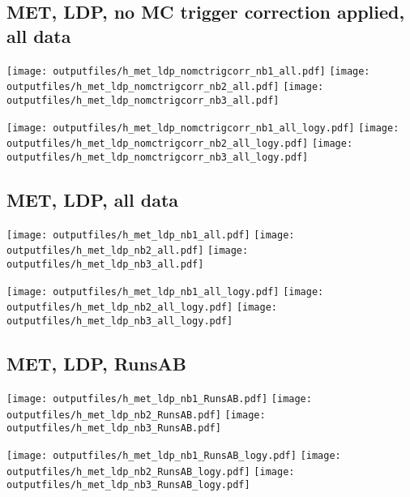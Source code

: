 \documentclass[11pt]{article}
\begin{document}
     \subsection{ MET, LDP, no MC trigger correction applied, all data}

    \noindent
     \texttt{[image: outputfiles/h\_met\_ldp\_nomctrigcorr\_nb1\_all.pdf]}
     \texttt{[image: outputfiles/h\_met\_ldp\_nomctrigcorr\_nb2\_all.pdf]}
     \texttt{[image: outputfiles/h\_met\_ldp\_nomctrigcorr\_nb3\_all.pdf]}

    \noindent
     \texttt{[image: outputfiles/h\_met\_ldp\_nomctrigcorr\_nb1\_all\_logy.pdf]}
     \texttt{[image: outputfiles/h\_met\_ldp\_nomctrigcorr\_nb2\_all\_logy.pdf]}
     \texttt{[image: outputfiles/h\_met\_ldp\_nomctrigcorr\_nb3\_all\_logy.pdf]}



    \subsection{ MET, LDP, all data}

    \noindent
     \texttt{[image: outputfiles/h\_met\_ldp\_nb1\_all.pdf]}
     \texttt{[image: outputfiles/h\_met\_ldp\_nb2\_all.pdf]}
     \texttt{[image: outputfiles/h\_met\_ldp\_nb3\_all.pdf]}

    \noindent
     \texttt{[image: outputfiles/h\_met\_ldp\_nb1\_all\_logy.pdf]}
     \texttt{[image: outputfiles/h\_met\_ldp\_nb2\_all\_logy.pdf]}
     \texttt{[image: outputfiles/h\_met\_ldp\_nb3\_all\_logy.pdf]}


    \subsection{ MET, LDP, RunsAB}

    \noindent
     \texttt{[image: outputfiles/h\_met\_ldp\_nb1\_RunsAB.pdf]}
     \texttt{[image: outputfiles/h\_met\_ldp\_nb2\_RunsAB.pdf]}
     \texttt{[image: outputfiles/h\_met\_ldp\_nb3\_RunsAB.pdf]}

    \noindent
     \texttt{[image: outputfiles/h\_met\_ldp\_nb1\_RunsAB\_logy.pdf]}
     \texttt{[image: outputfiles/h\_met\_ldp\_nb2\_RunsAB\_logy.pdf]}
     \texttt{[image: outputfiles/h\_met\_ldp\_nb3\_RunsAB\_logy.pdf]}
\end{document}
